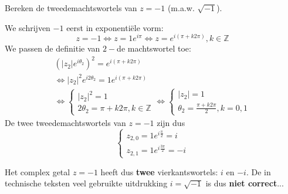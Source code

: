 \begin{voorbeeld}
	Bereken de tweedemachtswortels van $z=-1$ (m.a.w. $\sqrt{-1}$).\\
	
	\vspace{0.5cm}
	
	We schrijven $-1$ eerst in exponenti\"{e}le vorm:
	\[ z=-1 \iff z=1 e^{i\pi} \iff z=e^{i(\pi+k2\pi)}, k\in\mathbb{Z} \]
	We passen de definitie van $2-$de machtswortel toe:
	\[ \begin{array}{l} 
	(|z_{2}| e^{i \theta_{2}})^2 = e^{i(\pi + k2\pi)}  \\
	\iff |z_{2}|^2 e^{i2\theta_{2}} = 1e^{i(\pi + k2\pi)} \\
	\iff   \left\{ \begin{array}{l} |z_{2}|^2 =1 \\
	2\theta_{2}=\pi +k2\pi, k\in \mathbb{Z} \end{array} \right.
	\iff \left\{ \begin{array}{l} |z_{2}|=1 \\
	\theta_{2}=\frac{\pi + k2\pi}{2}, k=0,1 \end{array} \right.
	\end{array} 	  \]
	De twee tweedemachtswortels van $z=-1$ zijn dus
	\[  \left\{ \begin{array}{l} z_{2,0}=1e^{i\frac{\pi}{2}}= i \\
	z_{2,1}=1e^{i\frac{3\pi}{2}} = -i
	\end{array} \right.				 	
	\]
	
	Het complex getal $z=-1$ heeft dus {\bf twee} vierkantswortels: $i$ en $-i$. De in technische teksten veel gebruikte uitdrukking $i=\sqrt{-1}$ is dus {\bf niet correct}... 
\end{voorbeeld}
